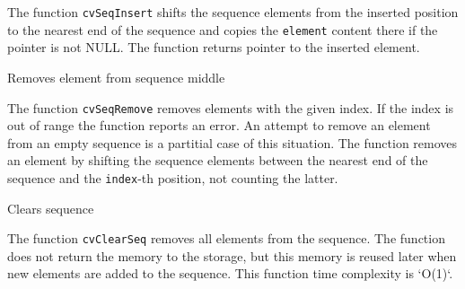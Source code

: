 \begin{description}
\end{description}

The function \texttt{cvSeqInsert} shifts the sequence elements from the inserted position to the nearest end of the sequence and copies the \texttt{element} content there if the pointer is not NULL. The function returns pointer to the inserted element.

\label{SeqRemove}

Removes element from sequence middle


\begin{description}
\end{description}


The function \texttt{cvSeqRemove} removes elements with the given
index. If the index is out of range the function reports an error. An
attempt to remove an element from an empty sequence is a partitial
case of this situation. The function removes an element by shifting
the sequence elements between the nearest end of the sequence and the
\texttt{index}-th position, not counting the latter.


\label{ClearSeq}

Clears sequence


\begin{description}
\end{description}


The function \texttt{cvClearSeq} removes all elements from the
sequence. The function does not return the memory to the storage, but this
memory is reused later when new elements are added to the sequence. This
function time complexity is `O(1)`.

